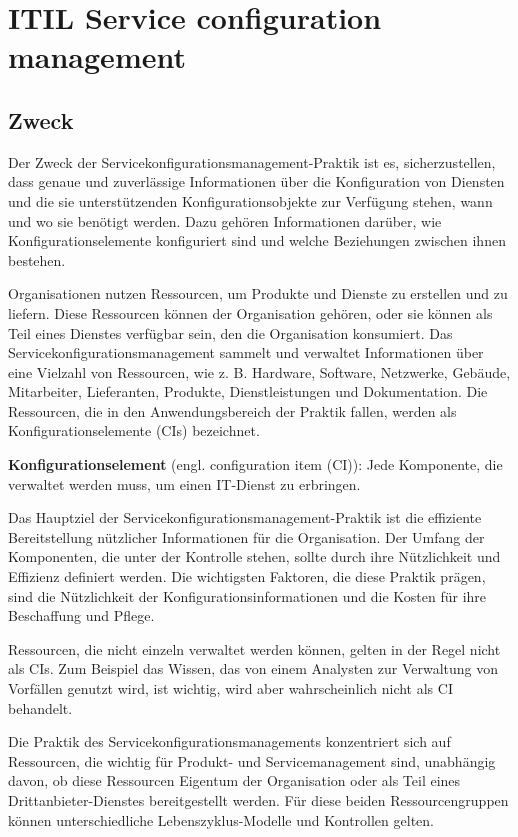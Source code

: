 \section{ITIL Service configuration management}

\subsection{Zweck}
Der Zweck der Servicekonfigurationsmanagement-Praktik ist es, sicherzustellen,
dass genaue und zuverlässige Informationen über die Konfiguration von
Diensten und die sie unterstützenden Konfigurationsobjekte zur Verfügung
stehen, wann und wo sie benötigt werden. Dazu gehören Informationen darüber,
wie Konfigurationselemente konfiguriert sind und welche
Beziehungen zwischen ihnen bestehen. 

Organisationen nutzen Ressourcen, um
Produkte und Dienste zu erstellen und zu liefern. Diese Ressourcen können der
Organisation gehören, oder sie können als Teil eines Dienstes verfügbar
sein, den die Organisation konsumiert. Das Servicekonfigurationsmanagement
sammelt und verwaltet Informationen über eine Vielzahl von Ressourcen, wie 
z. B. Hardware, Software, Netzwerke, Gebäude, Mitarbeiter, Lieferanten, Produkte,
Dienstleistungen und Dokumentation. Die Ressourcen, die in den
Anwendungsbereich der Praktik fallen, werden als Konfigurationselemente (CIs)
bezeichnet.

\begin{center}
	\textbf{Konfigurationselement} (engl. configuration item (CI)):
	Jede Komponente, die verwaltet werden muss, um einen IT-Dienst zu erbringen.
\end{center}

\noindent
Das Hauptziel der Servicekonfigurationsmanagement-Praktik ist die effiziente
Bereitstellung nützlicher Informationen für die Organisation.
Der Umfang der Komponenten, die unter der Kontrolle stehen, sollte durch
ihre Nützlichkeit und Effizienz definiert werden. Die wichtigsten Faktoren,
die diese Praktik prägen, sind die Nützlichkeit der
Konfigurationsinformationen und die Kosten für ihre Beschaffung und Pflege.

Ressourcen, die nicht einzeln verwaltet werden können, gelten in der Regel
nicht als CIs. Zum Beispiel das Wissen, das von einem Analysten zur Verwaltung
von Vorfällen genutzt wird, ist wichtig, wird aber wahrscheinlich nicht als CI
behandelt. 

Die Praktik des
Servicekonfigurationsmanagements konzentriert sich auf Ressourcen, die wichtig
für Produkt- und Servicemanagement sind, unabhängig davon, ob
diese Ressourcen Eigentum der Organisation oder als Teil 
eines Drittanbieter-Dienstes bereitgestellt werden. Für
diese beiden Ressourcengruppen können unterschiedliche Lebenszyklus-Modelle und
Kontrollen gelten.

